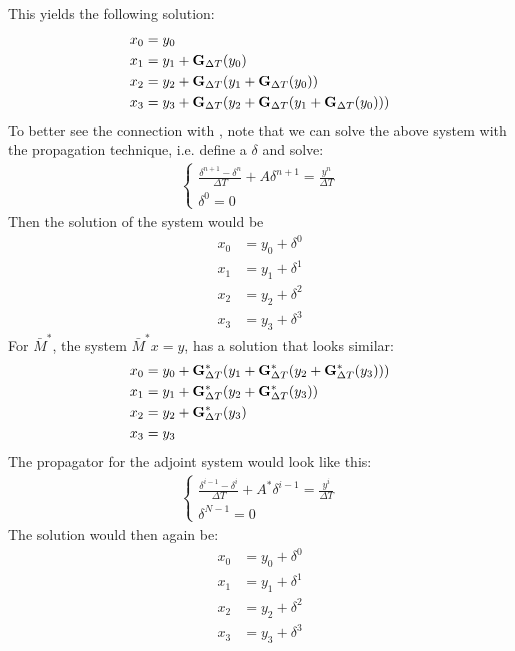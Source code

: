 This yields the following solution:
\begin{align*}
x_0 &=y_0 \\
x_1 &=y_1 + \bold{G}_{\Delta T}(y_0) \\
x_2 &=y_2 + \bold{G}_{\Delta T}(y_1 + \bold{G}_{\Delta T}(y_0)) \\
x_3 &=y_3 + \bold{G}_{\Delta T}(y_2 + \bold{G}_{\Delta T}(y_1 + \bold{G}_{\Delta T}(y_0))) 
\end{align*}
To better see the connection with \cite{lions2001resolution}, note that we can solve the above system with the propagation technique, i.e. define a $\delta$ and solve:
\begin{align}
\left\{
     \begin{array}{lr}
		\frac{\delta^{n+1} -\delta^n }{\Delta T } + A\delta^{n+1} = \frac{y^n}{\Delta T} \\
		\delta^0 = 0
	\end{array} \right.
\end{align} 
Then the solution of the system would be 
\begin{align*}
x_0 &=y_0 +\delta^0\\
x_1 &=y_1 + \delta^1 \\
x_2 &=y_2 +\delta^2\\
x_3 &=y_3 + \delta^3 
\end{align*}
For $\bar{M}^{*}$, the system $\bar{M}^{*}x=y$, has a solution that looks similar:
\begin{align*}
x_0 &=y_0 +\bold{G}_{\Delta T}^*(y_1 + \bold{G}_{\Delta T}^*(y_2 + \bold{G}_{\Delta T}^*(y_ 3)))\\
x_1 &=y_1 + \bold{G}_{\Delta T}^*(y_2 + \bold{G}_{\Delta T}^*(y_ 3))\\
x_2 &=y_2 + \bold{G}_{\Delta T}^*(y_ 3) \\
x_3 &=y_3 
\end{align*}
The propagator for the adjoint system would look like this:
\begin{align}
\left\{
     \begin{array}{lr}
		\frac{\delta^{i-1} -\delta^i }{\Delta T } + A^*\delta^{i-1} = \frac{y^i}{\Delta T} \\
		\delta^{N-1} = 0
	\end{array} \right.
\end{align} 
The solution would then again be:
\begin{align*}
x_0 &=y_0 +\delta^0\\
x_1 &=y_1 + \delta^1 \\
x_2 &=y_2 +\delta^2\\
x_3 &=y_3 + \delta^3 
\end{align*}
